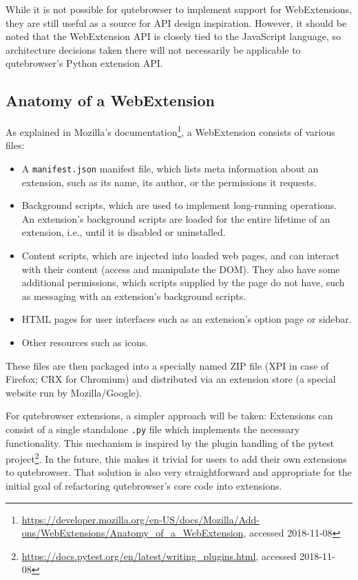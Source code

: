 While it is not possible for qutebrowser to implement support for WebExtensions,
they are still useful as a source for API design inspiration. However, it
should be noted that the WebExtension API is closely tied to the JavaScript
language, so architecture decisions taken there will not necessarily be
applicable to qutebrowser's Python extension API.

\subsection{Anatomy of a WebExtension}
\label{anatomy}

As explained in Mozilla's
documentation\footnote{\url{https://developer.mozilla.org/en-US/docs/Mozilla/Add-ons/WebExtensions/Anatomy_of_a_WebExtension},
  accessed 2018-11-08},
a WebExtension consists of various files:

\begin{itemize}
  \item A \verb|manifest.json| manifest file, which lists meta information about
    an extension, such as its name, its author, or the permissions it requests.
  \item Background scripts, which are used to implement long-running operations.
    An extension's background scripts are loaded for the entire lifetime of an
    extension, i.e., until it is disabled or uninstalled.
  \item Content scripts, which are injected into loaded web pages, and can
    interact with their content (access and manipulate the DOM). They also have
    some additional permissions, which scripts supplied by the page do not have,
    such as messaging with an extension's background scripts.
  \item HTML pages for user interfaces such as an extension's option page or sidebar.
  \item Other resources such as icons.
\end{itemize}

These files are then packaged into a specially named ZIP file (XPI in case of
Firefox; CRX for Chromium) and distributed via an extension store (a special
website run by Mozilla/Google).

For qutebrowser extensions, a simpler approach will be taken: Extensions can
consist of a single standalone \verb|.py| file which implements the necessary
functionality. This mechanism is inspired by the plugin handling of the pytest
project\footnote{\url{https://docs.pytest.org/en/latest/writing_plugins.html},
  accessed 2018-11-08}. In the future, this makes it trivial for users to add
their own extensions to qutebrowser. That solution is also very straightforward and
appropriate for the initial goal of refactoring qutebrowser's core code into
extensions.

